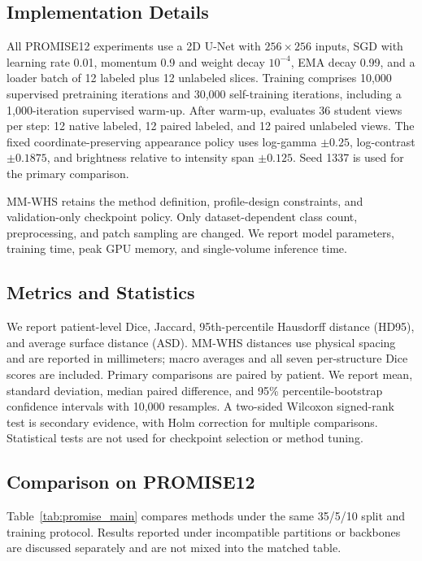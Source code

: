 \subsection{Implementation Details}
All PROMISE12 experiments use a 2D U-Net with $256\times256$ inputs, SGD with learning rate 0.01, momentum 0.9 and weight decay $10^{-4}$, EMA decay 0.99, and a loader batch of 12 labeled plus 12 unlabeled slices. Training comprises 10,000 supervised pretraining iterations and 30,000 self-training iterations, including a 1,000-iteration supervised warm-up. After warm-up, \method{} evaluates 36 student views per step: 12 native labeled, 12 paired labeled, and 12 paired unlabeled views. The fixed coordinate-preserving appearance policy uses log-gamma $\pm0.25$, log-contrast $\pm0.1875$, and brightness relative to intensity span $\pm0.125$. Seed 1337 is used for the primary comparison.

MM-WHS retains the method definition, profile-design constraints, and validation-only checkpoint policy. Only dataset-dependent class count, preprocessing, and patch sampling are changed. We report model parameters, training time, peak GPU memory, and single-volume inference time.

\subsection{Metrics and Statistics}
We report patient-level Dice, Jaccard, 95th-percentile Hausdorff distance (HD95), and average surface distance (ASD). MM-WHS distances use physical spacing and are reported in millimeters; macro averages and all seven per-structure Dice scores are included. Primary comparisons are paired by patient. We report mean, standard deviation, median paired difference, and 95\% percentile-bootstrap confidence intervals with 10,000 resamples. A two-sided Wilcoxon signed-rank test is secondary evidence, with Holm correction for multiple comparisons. Statistical tests are not used for checkpoint selection or method tuning.

\subsection{Comparison on PROMISE12}
Table~\ref{tab:promise_main} compares methods under the same 35/5/10 split and training protocol. Results reported under incompatible partitions or backbones are discussed separately and are not mixed into the matched table.

